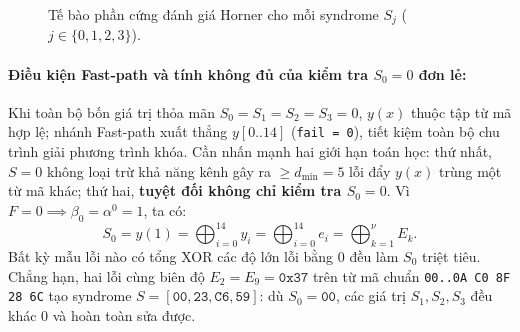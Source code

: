 \begin{figure}[!htb]
\centering
{}
\caption{Tế bào phần cứng đánh giá Horner cho mỗi syndrome $S_j$ ($j \in \{0,1,2,3\}$).}
\label{fig:horner_syndrome}
\end{figure}

\paragraph{Điều kiện Fast-path và tính không đủ của kiểm tra $S_0 = 0$ đơn lẻ:}
Khi toàn bộ bốn giá trị thỏa mãn $S_0 = S_1 = S_2 = S_3 = 0$, $y(x)$ thuộc tập từ mã hợp lệ; nhánh Fast-path xuất thẳng $y[0..14]$ (\texttt{fail = 0}), tiết kiệm toàn bộ chu trình giải phương trình khóa. Cần nhấn mạnh hai giới hạn toán học: thứ nhất, $S = 0$ không loại trừ khả năng kênh gây ra $\ge d_{\min} = 5$ lỗi đẩy $y(x)$ trùng một từ mã khác; thứ hai, \textbf{tuyệt đối không chỉ kiểm tra $S_0 = 0$}. Vì $F = 0 \implies \beta_0 = \alpha^0 = 1$, ta có:
\begin{equation}
S_0 = y(1) = \bigoplus_{i=0}^{14} y_i = \bigoplus_{i=0}^{14} e_i = \bigoplus_{k=1}^{\nu} E_k.
\end{equation}
Bất kỳ mẫu lỗi nào có tổng XOR các độ lớn lỗi bằng $0$ đều làm $S_0$ triệt tiêu. Chẳng hạn, hai lỗi cùng biên độ $E_2 = E_9 = \texttt{0x37}$ trên từ mã chuẩn \texttt{00..0A C0 8F 28 6C} tạo syndrome $S = [\texttt{00}, \texttt{23}, \texttt{C6}, \texttt{59}]$: dù $S_0 = \texttt{00}$, các giá trị $S_1, S_2, S_3$ đều khác $0$ và hoàn toàn sửa được.

